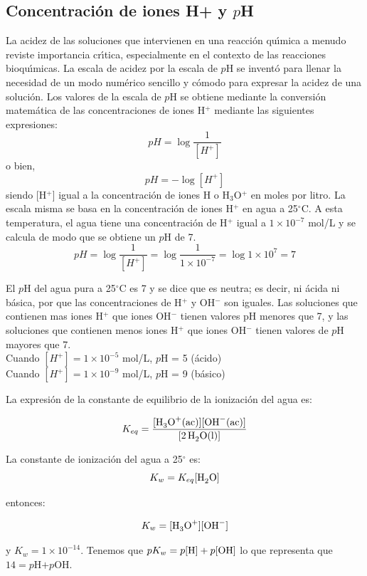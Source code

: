 \subsection{Concentraci\'on de iones H+ y $p$H}
La acidez de las soluciones que intervienen en una reacci\'on qu\'{\i}mica a menudo reviste importancia cr\'{\i}tica, especialmente en el contexto de las reacciones bioqu\'{\i}micas.  La escala de acidez por la escala de  $p$H se invent\'o para llenar la necesidad de un modo num\'erico sencillo y c\'omodo para expresar la acidez de una soluci\'on. Los valores de la escala de $p$H se obtiene mediante la conversi\'on matem\'atica de las concentraciones de iones H$^+$ mediante las siguientes expresiones:
\begin{equation}
pH = \log \frac{1}{[H^+]}
\end{equation}
o bien,
\begin{equation}
 pH = -\log [H^+]
\label{ph:1}
\end{equation}
 siendo  [H$^+$] igual a la concentraci\'on de iones  H o  H$_3$O$^+$ en moles
por litro. La escala misma se basa en la concentraci\'on de iones H$^+$
en agua a 25$^\circ$C. A esta temperatura, el agua tiene una
concentraci\'on de H$^+$ igual a $1\times10^{-7}$ mol/L y se calcula de
modo que se obtiene un $p$H de 7.
$$
pH = \log \frac{1}{[H^+]}=\log \frac{1}{1\times 10^{-7}}=\log 1\times
10^7 = 7
$$

El $p$H del agua pura a 25$^\circ$C es 7 y se dice que es neutra; es
decir, ni \'acida ni b\'asica, por que las concentraciones de H$^+$ y
OH$^-$ son iguales. Las soluciones que contienen mas iones H$^+$ que
iones OH$^-$ tienen valores pH menores que 7, y las soluciones que
contienen menos iones H$^+$ que iones OH$^-$ tienen valores de $p$H
mayores que 7.\\
Cuando $[H^+] = 1\times 10^{-5}$ mol/L, $p$H = 5 (\'acido)\\
Cuando $[H^+] = 1\times 10^{-9}$ mol/L, $p$H = 9 (b\'asico)

\begin{example}
\begin{center}
\end{center}

La expresi\'on de la constante de equilibrio de la ionizaci\'on del agua es:

\begin{equation}
  K_{eq} = \frac{[\ce{H3O+ (ac)}][\ce{OH^- (ac)}]}{[\ce{2H2O (l)}]} 
\end{equation}

La constante de ionizaci\'on del agua a 25$^\circ$ es:
\begin{equation}
  K_w = K_{eq} [\ce{H2O}]
\end{equation}

entonces:

\begin{equation}
 K_w = [\ce{H3O^+}][\ce{OH^-}]
\end{equation}

y $ K_w = 1\times 10^{-14}$. Tenemos que  $pK_w = p[\ce{H}]  + p[\ce{OH}] $  lo que representa que  $14 = p$H$ + p$OH.
\end{example}

